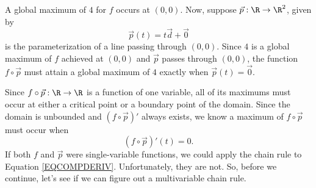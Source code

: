 A global maximum of $4$ for $f$ occurs at $(0,0)$.  Now, suppose $\vec p:\R\to\R^2$, given
by
\[
	\vec p(t) = t\vec d+\vec 0
\]
is the parameterization of a line passing through $(0,0)$.  Since $4$ is a global
maximum of $f$ achieved at $(0,0)$ and $\vec p$ passes through $(0,0)$, the function
$f\circ \vec p$ must attain a global maximum of $4$ exactly when $\vec p(t)=\vec 0$.

\begin{center}
\end{center}

Since $f\circ \vec p:\R\to\R$ is a function of one variable, all of its maximums
must occur at either a critical point or a boundary point of the domain.  Since
the domain is unbounded and $(f\circ \vec p)'$ always exists, we know a maximum
of $f\circ \vec p$ must occur when
\begin{equation}
	\label{EQCOMPDERIV}
	(f\circ\vec p)'(t)=0.
\end{equation}
If both $f$ and $\vec p$ were single-variable functions, we could
apply the chain rule to Equation \eqref{EQCOMPDERIV}.  Unfortunately, they
are not.  So, before we continue, let's see if we can figure out a multivariable
chain rule.


